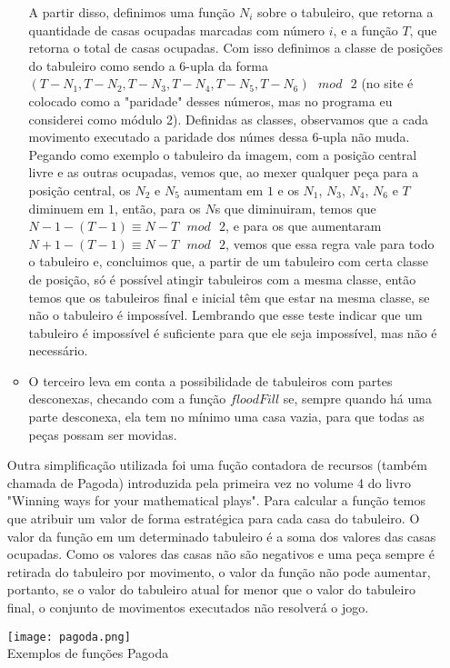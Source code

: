 \documentclass[12pt, a4paper]{article} %
\begin{document}
\begin{enumerate}
\begin{itemize}
A partir disso, definimos uma função $N_i$ sobre o tabuleiro, que retorna a quantidade de casas ocupadas marcadas com número $i$, e a função $T$, que retorna o total de casas ocupadas. Com isso definimos a classe de posições do tabuleiro como sendo a 6-upla da forma $(T-N_1,T-N_2,T-N_3,T-N_4,T-N_5,T-N_6)\text{ }mod\text{ }2$ (no site é colocado como a "paridade" desses números, mas no programa eu considerei como módulo 2). Definidas as classes, observamos que a cada movimento executado a paridade dos númes dessa 6-upla não muda. Pegando como exemplo o tabuleiro da imagem, com a posição central livre e as outras ocupadas, vemos que, ao mexer qualquer peça para a posição central, os $N_2$ e $N_5$ aumentam em $1$ e os $N_1$, $N_3$, $N_4$, $N_6$ e $T$ diminuem em $1$, então, para os $N$s que diminuiram, temos que $N-1-(T-1)\equiv N-T\text{ }mod\text{ }2$, e para os que aumentaram $N+1-(T-1)\equiv N-T\text{ }mod\text{ }2$, vemos que essa regra vale para todo o tabuleiro e, concluimos que, a partir de um tabuleiro com certa classe de posição, só é possível atingir tabuleiros com a mesma classe, então temos que os tabuleiros final e inicial têm que estar na mesma classe, se não o tabuleiro é impossível. Lembrando que esse teste indicar que um tabuleiro é impossível é suficiente para que ele seja impossível, mas não é necessário.
\item O terceiro leva em conta a possibilidade de tabuleiros com partes desconexas, checando com a função $floodFill$ se, sempre quando há uma parte desconexa, ela tem no mínimo uma casa vazia, para que todas as peças possam ser movidas.\\[-0.5cm]
\end {itemize}
Outra simplificação utilizada foi uma fução contadora de recursos (também chamada de Pagoda) introduzida pela primeira vez no volume 4 do livro "Winning ways for your mathematical plays". Para calcular a função temos que atribuir um valor de forma estratégica para cada casa do tabuleiro. O valor da função em um determinado tabuleiro é a soma dos valores das casas ocupadas. Como os valores das casas não são negativos e uma peça sempre é retirada do tabuleiro por movimento, o valor da função não pode aumentar, portanto, se o valor do tabuleiro atual for menor que o valor do tabuleiro final, o conjunto de movimentos executados não resolverá o jogo.\\
\small
\begin{center}
\texttt{[image: pagoda.png]}\\
Exemplos de funções Pagoda\cite{wwmp}\\

\end{center}
\end{enumerate}
\end{document}
